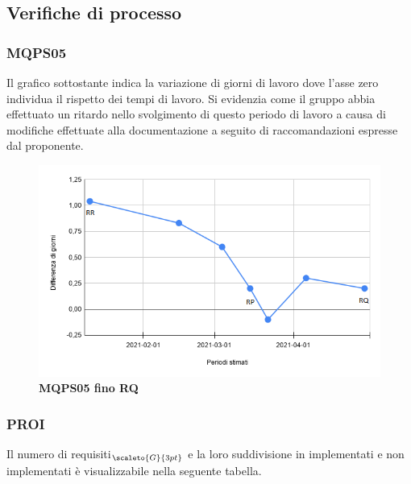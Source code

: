 {{{{\subsection{Verifiche di processo}\label{ResocontoAttivitàDiVerificaRevisioneDiQualificaVerificheDiProcesso}

\subsubsection{MQPS05}\label{ResocontoAttivitàDiVerificaRevisioneDiQualificaVerificheDiProcessoMPQS05}

Il grafico sottostante indica la variazione di giorni di lavoro dove l'asse zero individua il rispetto dei tempi di lavoro. Si evidenzia come il gruppo abbia effettuato un ritardo nello svolgimento di questo periodo di lavoro a causa di modifiche effettuate alla documentazione a seguito di raccomandazioni espresse dal proponente.
\begin{center}
	\begin{figure}[H]
		\includegraphics[width=1\linewidth]{../immagini/Metriche/MQPS05_RQ.png}
		\caption{\textbf{MQPS05 fino RQ}}
	\end{figure}
\end{center}

\subsubsection{PROI}\label{ResocontoAttivitàDiVerificaRevisioneDiQualificaVerificheDiProcessoPROI}

Il numero di requisiti$_{\scaleto{G}{3pt}}$ e la loro suddivisione in implementati e non implementati è visualizzabile nella seguente tabella.

}}}}
